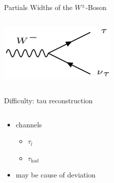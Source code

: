 \begin{frame}{Partials Widths of the $W^{\pm}$-Boson}
\begin{columns}
\begin{column}{0.5\textwidth}
                \includegraphics[width = 0.42\textwidth]{content/images/Wdecay_tau.png}
            \end{column}
        \end{columns}
    \end{frame}

    \begin{frame}{Difficulty: tau reconstruction}
        \begin{columns}
            \begin{column}{0.45\textwidth}
                \begin{itemize}
                    \item channels
                    \begin{itemize}
                        \item $ \tau_l$
                        \item $ \tau_{\text{had}}$
                    \end{itemize}
                    \item <4> may be cause of deviation
                \end{itemize}
            \end{column}
    

\end{columns}
\end{frame}
